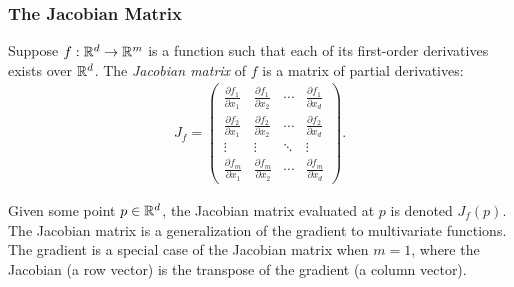 \subsubsection{The Jacobian Matrix}
Suppose $f:\mathbb{R}^d \to\mathbb{R}^m$ is a function such that each of its first-order derivatives exists over $\mathbb{R}^d$. The \emph{Jacobian matrix} of $f$ is a matrix of partial derivatives:
\begin{align}
\label{eq:jacobian}
J_f = \left(\begin{array}{cccc}
    \frac{\partial f_1}{\partial x_1} & \frac{\partial f_1}{\partial x_2} & \cdots & \frac{\partial f_1}{\partial x_d} \\
    \frac{\partial f_2}{\partial x_1} & \frac{\partial f_2}{\partial x_2} & \cdots & \frac{\partial f_2}{\partial x_d} \\
    \vdots & \vdots & \ddots & \vdots \\
    \frac{\partial f_m}{\partial x_1} & \frac{\partial f_m}{\partial x_2} & \cdots & \frac{\partial f_m}{\partial x_d}
\end{array}\right).
\end{align}

Given some point $p\in \mathbb{R}^d$, the Jacobian matrix evaluated at $p$ is denoted $J_f(p)$. The Jacobian matrix is a generalization of the gradient to multivariate functions. The gradient is a special case of the Jacobian matrix when $m=1$, where the Jacobian (a row vector) is the transpose of the gradient (a column vector).

